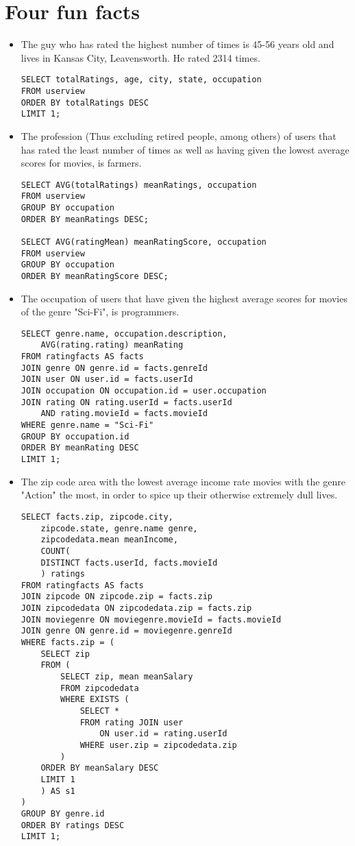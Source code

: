 \section{Four fun facts}
\begin{itemize}
	\item The guy who has rated the highest number of times is 45-56 years old and lives in Kansas City, Leavensworth. He rated 2314 times. 
		\begin{lstlisting} 
SELECT totalRatings, age, city, state, occupation 
FROM userview
ORDER BY totalRatings DESC
LIMIT 1; 
		\end{lstlisting}
	\item The profession (Thus excluding retired people, among others) of users that has rated the least number of times as well as having given the lowest average scores for movies, is farmers. 
		\begin{lstlisting} 
SELECT AVG(totalRatings) meanRatings, occupation
FROM userview
GROUP BY occupation
ORDER BY meanRatings DESC;

SELECT AVG(ratingMean) meanRatingScore, occupation
FROM userview
GROUP BY occupation
ORDER BY meanRatingScore DESC;
		\end{lstlisting}
	\item The occupation of users that have given the highest average scores for movies of the genre "Sci-Fi", is programmers. 
		\begin{lstlisting} 
SELECT genre.name, occupation.description, 
	AVG(rating.rating) meanRating
FROM ratingfacts AS facts
JOIN genre ON genre.id = facts.genreId
JOIN user ON user.id = facts.userId
JOIN occupation ON occupation.id = user.occupation
JOIN rating ON rating.userId = facts.userId 
	AND rating.movieId = facts.movieId
WHERE genre.name = "Sci-Fi"
GROUP BY occupation.id
ORDER BY meanRating DESC
LIMIT 1;
		\end{lstlisting}
	\item The zip code area with the lowest average income rate movies with the genre "Action" the most, in order to spice up their otherwise extremely dull lives. 
		\begin{lstlisting} 
SELECT facts.zip, zipcode.city, 
	zipcode.state, genre.name genre, 
	zipcodedata.mean meanIncome,
	COUNT(
	DISTINCT facts.userId, facts.movieId
	) ratings
FROM ratingfacts AS facts
JOIN zipcode ON zipcode.zip = facts.zip
JOIN zipcodedata ON zipcodedata.zip = facts.zip
JOIN moviegenre ON moviegenre.movieId = facts.movieId
JOIN genre ON genre.id = moviegenre.genreId
WHERE facts.zip = (
	SELECT zip 
	FROM (
		SELECT zip, mean meanSalary
		FROM zipcodedata
        WHERE EXISTS (
        	SELECT * 
        	FROM rating JOIN user 
        		ON user.id = rating.userId 
        	WHERE user.zip = zipcodedata.zip
        )
	ORDER BY meanSalary DESC
	LIMIT 1
	) AS s1
)
GROUP BY genre.id
ORDER BY ratings DESC
LIMIT 1;
		\end{lstlisting}
\end{itemize}